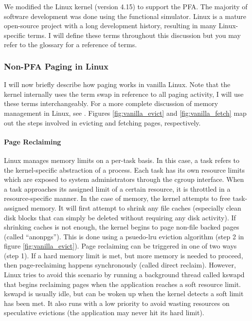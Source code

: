 We modified the Linux kernel (version 4.15\cite{linux}) to support the PFA. The
majority of software development was done using the functional simulator. Linux
is a mature open-source project with a long development history, resulting in
many Linux-specific terms. I will define these terms throughout this discussion
but you may refer to the glossary for a reference of terms.

\subsubsection{Non-PFA Paging in Linux} \label{sec:vanillaLinux}
I will now briefly describe how paging works in vanilla Linux. Note that the
kernel internally uses the term \gls{swap} in reference to all paging activity,
I will use these terms interchangeably. For a more complete discussion of
memory management in Linux, see \cite{linuxBook}. Figures
\ref{fig:vanilla_evict} and \ref{fig:vanilla_fetch} map out the steps involved
in evicting and fetching pages, respectively.

\paragraph{Page Reclaiming}
Linux manages memory limits on a per-task basis. In this case, a \gls{task}
refers to the kernel-specific abstraction of a process. Each task has its own
resource limits which are exposed to system administrators through the
\gls{cgroup} interface. When a task approaches its assigned limit of a certain
resource, it is throttled in a resource-specific manner. In the case of memory,
the kernel attempts to free task-assigned memory. It will first attempt to
shrink any file caches (especially clean disk blocks that can simply be deleted
without requiring any disk activity). If shrinking caches is not enough, the
kernel begins to page non-file backed pages (called ``\glspl{anonpg}''). This
is done using a psuedo-\gls{lru} eviction algorithm (step 2 in figure
\ref{fig:vanilla_evict}). Page reclaiming can be triggered
in one of two ways (step 1). If a hard memory limit is met, but more memory is needed to
proceed, then page-reclaiming happens synchronously (called direct reclaim).
However, Linux tries to avoid this scenario by running a background thread
called \gls{kswapd} that begins reclaiming pages when the application reaches a
soft resource limit. \Gls{kswapd} is usually idle, but can be woken up when the
kernel detects a soft limit has been met. It also runs with a low priority to
avoid wasting resources on speculative evictions (the application may never hit
its hard limit).

